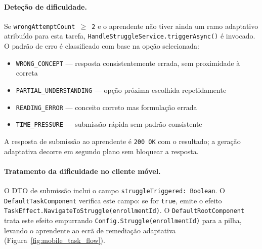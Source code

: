 \paragraph{Deteção de dificuldade.}
Se \texttt{wrongAttemptCount $\geq$ 2} e o aprendente não tiver ainda
um ramo adaptativo atribuído para esta tarefa,
\texttt{HandleStruggleService.triggerAsync()} é invocado.
O padrão de erro é classificado com base na opção selecionada:

\begin{itemize}
  \item \texttt{WRONG\_CONCEPT} — resposta consistentemente errada, sem
    proximidade à correta
  \item \texttt{PARTIAL\_UNDERSTANDING} — opção próxima escolhida
    repetidamente
  \item \texttt{READING\_ERROR} — conceito correto mas formulação errada
  \item \texttt{TIME\_PRESSURE} — submissão rápida sem padrão consistente
\end{itemize}

A resposta de submissão ao aprendente é \texttt{200 OK} com o resultado;
a geração adaptativa decorre em segundo plano sem bloquear a resposta.

\paragraph{Tratamento da dificuldade no cliente móvel.}
O DTO de submissão inclui o campo \texttt{struggleTriggered: Boolean}.
O \texttt{DefaultTaskComponent} verifica este campo: se for \texttt{true},
emite o efeito \texttt{TaskEffect.NavigateToStruggle(enrollmentId)}.
O \texttt{DefaultRootComponent} trata este efeito empurrando
\texttt{Config.Struggle(enrollmentId)} para a pilha, levando o aprendente
ao ecrã de remediação adaptativa (Figura~\ref{fig:mobile_task_flow}).


